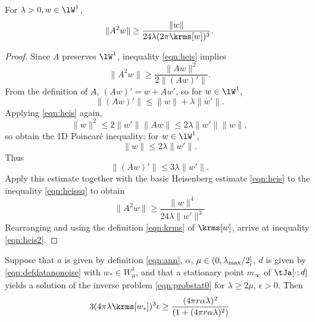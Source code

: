 \begin{proposition}
  \label{thm:heis2}
  For $\lambda>0, w \in \lW^1$,
  \begin{equation}
    \label{eqn:heis2}
    \|A^2w\| \ge \frac{\|w\|}{24 \lambda (2\pi\krms[w])^3}.
  \end{equation}
\end{proposition}

\begin{proof}
  Since $A$  preserves $\lW^1$, inequality \ref{eqn:heis} implies
  \begin{equation}
    \label{eqn:heissq}
    \|A^2w\| \ge \frac{\|Aw\|^2}{2\|(Aw)'\|}.
  \end{equation}
  From the definition of $A$, $(Aw)'=w +Aw'$, so for $w \in \lW^1$,
  \[
    \|(Aw)'\| \le \|w\|+ \lambda\|w'\|.
  \]
  Applying \ref{eqn:heis} again,
  \[
    \|w\|^2 \le 2\|w'\|\|Aw\|\le 2\lambda \|w'\|\|w\|,
  \]
  so obtain the 1D Poincar\'{e} inequality: for $w \in \lW^1$,
  \[
    \|w\| \le 2\lambda\|w'\|.
  \]
  Thus
  \[
    \|(Aw)'\| \le 3\lambda\|w'\|.
  \]
  Apply this estimate together with the basic Heisenberg estimate
  \ref{eqn:heis} to the inequality \ref{eqn:heissq} to obtain
  \[
    \|A^2w\| \ge \frac{\|w\|^4}{24\lambda \|w'\|^3}
  \]
  Rearranging and using the definition \ref{eqn:krms} of $\krms[w]$,
  arrive at inequality \ref{eqn:heis2}.
\end{proof}

\begin{theorem}
  \label{thm:ipnonoisenec}
  Suppose that $a$ is given by definition \ref{eqn:ann}, $\alpha$,
  $\mu \in (0,\lambda_{\rm max}/2]$, $d$ is given by
  \ref{eqn:defdatanonoise} with $w_* \in W_{\mu}^1$, and that a
  stationary point $m_{\infty}$ of $\tJa[\cdot;d]$ yields a solution
  of the inverse problem \ref{eqn:probstat0} for $\lambda \ge 2\mu$,
  $\epsilon>0$. Then
\begin{equation}
  \label{eqn:epsalpha}
  3 (4\pi \lambda \krms[w_*])^3 \epsilon \ge \frac{(4\pi  r\alpha\lambda)^2}
  {(1+(4\pi r \alpha \lambda)^2)}
\end{equation}
\end{theorem}


